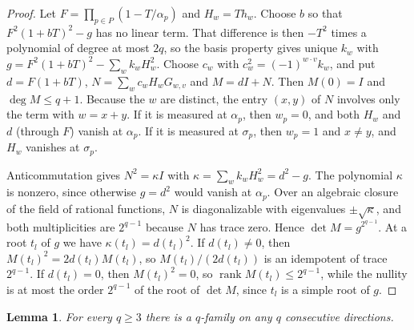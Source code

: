 \documentclass[11pt]{article}
\newtheorem{lemma}[theorem]{Lemma}
\newcommand{\rank}{\operatorname{rank}}
\begin{document}
\begin{proof}
Let $F=\prod_{p\in P}(1-T/\alpha_p)$ and $H_w=Th_w$. Choose $b$ so that $F^2(1+bT)^2-g$ has no linear term. That difference is then $-T^2$ times a polynomial of degree at most $2q$, so the basis property gives unique $k_w$ with $g=F^2(1+bT)^2-\sum_wk_wH_w^2$. Choose $c_w$ with $c_w^2=(-1)^{w\cdot v}k_w$, and put $d=F(1+bT)$, $N=\sum_wc_wH_wG_{w,v}$ and $M=dI+N$. Then $M(0)=I$ and $\deg M\le q+1$. Because the $w$ are distinct, the entry $(x,y)$ of $N$ involves only the term with $w=x+y$. If it is measured at $\alpha_p$, then $w_p=0$, and both $H_w$ and $d$ (through $F$) vanish at $\alpha_p$. If it is measured at $\sigma_p$, then $w_p=1$ and $x\ne y$, and $H_w$ vanishes at $\sigma_p$.

Anticommutation gives $N^2=\kappa I$ with $\kappa=\sum_wk_wH_w^2=d^2-g$. The polynomial $\kappa$ is nonzero, since otherwise $g=d^2$ would vanish at $\alpha_p$. Over an algebraic closure of the field of rational functions, $N$ is diagonalizable with eigenvalues $\pm\sqrt\kappa$, and both multiplicities are $2^{q-1}$ because $N$ has trace zero. Hence $\det M=g^{2^{q-1}}$. At a root $t_l$ of $g$ we have $\kappa(t_l)=d(t_l)^2$. If $d(t_l)\ne0$, then $M(t_l)^2=2d(t_l)M(t_l)$, so $M(t_l)/(2d(t_l))$ is an idempotent of trace $2^{q-1}$. If $d(t_l)=0$, then $M(t_l)^2=0$, so $\rank M(t_l)\le2^{q-1}$, while the nullity is at most the order $2^{q-1}$ of the root of $\det M$, since $t_l$ is a simple root of $g$.
\end{proof}
\begin{lemma}\label{lem:families}
For every $q\ge3$ there is a $q$-family on any $q$ consecutive directions.
\end{lemma}
\end{document}
